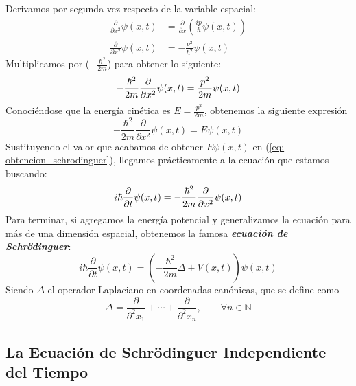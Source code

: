 \documentclass{article}
\numberwithin{equation}{section} %
\begin{document}
    Derivamos por segunda vez respecto de la variable espacial:
    \begin{align*}
        \frac{\partial}{\partial x^{2}} \psi(x, t) &= \frac{\partial}{\partial x} \left( \frac{ip}{\hbar} \psi(x, t) \right) \\[10pt]
        \frac{\partial}{\partial x^{2}} \psi(x, t) &= - \frac{p^{2}}{\hbar^{2}} \psi(x, t)
    \end{align*}
    Multiplicamos por (\( - \frac{\hbar^{2}}{2m} \)) para obtener lo siguiente:
    \begin{equation*}
        - \frac{\hbar^{2}}{2m} \frac{\partial}{\partial x^{2}} \psi(x, t) = \frac{p^{2}}{2m} \psi(x, t)
        \\[2mm]
    \end{equation*}
    Conociéndose que la energía cinética es \( E = \frac{p^{2}}{2m} \), obtenemos la siguiente expresión
    \begin{equation*}
        - \frac{\hbar^{2}}{2m} \frac{\partial}{\partial x^{2}} \psi(x, t) = E \psi(x, t)
    \end{equation*}
    Sustituyendo el valor que acabamos de obtener \( E \psi(x, t) \) en (\ref{eq: obtencion_schrodinguer}), llegamos prácticamente a la ecuación que estamos buscando:
    \begin{equation*}
        i \hbar \frac{\partial}{\partial t} \psi(x, t) = - \frac{\hbar^{2}}{2m} \frac{\partial}{\partial x^{2}} \psi(x, t)
        \\[2mm]
    \end{equation*}
    Para terminar, si agregamos la energía potencial y generalizamos la ecuación para más de una dimensión espacial, obtenemos la famosa \textbf{\textit{ecuación de Schrödinguer}}:
    \begin{equation}
        \boxed{i \hbar \frac{\partial}{\partial t} \psi(x, t) = (- \frac{\hbar^{2}}{2m} \Delta + V(x, t)) \psi(x, t)} 
        \label{eq: ecuacion_schrodinguer}     
    \end{equation}
    Siendo \( \Delta \) el operador Laplaciano en coordenadas canónicas, que se define como
    \begin{equation*}
        \Delta = \frac{\partial}{\partial^{2} x_{1}} + \cdots + \frac{\partial}{\partial^{2} x_{n}}, \qquad \forall n \in \mathbb{N}
    \end{equation*}

    \vspace{5mm}

    \subsection{La Ecuación de Schrödinguer Independiente del Tiempo}
\end{document}
